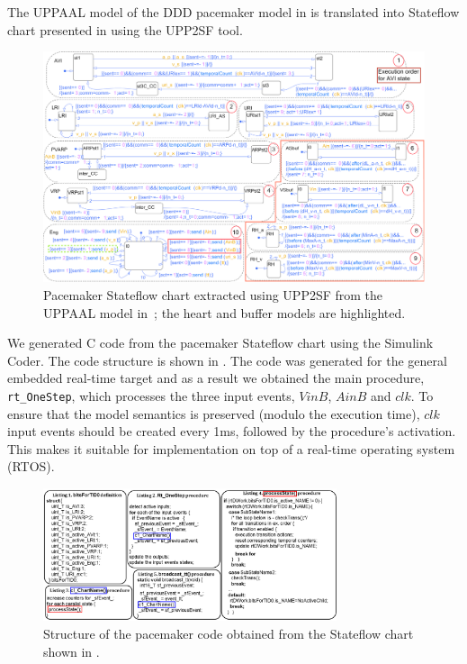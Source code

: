 The UPPAAL model of the DDD pacemaker model in  is translated into Stateflow chart presented in  using the UPP2SF tool.
\begin{figure} [!t]
\center
\includegraphics[width=1.00\textwidth]{figs/PM_SF_buffer_newC1.png} 
\caption{Pacemaker Stateflow chart extracted using UPP2SF from the UPPAAL model in~; the heart and buffer models are highlighted.} 
\label{fig:PM_sf}
\end{figure}

We generated C code from the pacemaker Stateflow chart using the Simulink Coder. The code structure is shown in .
The code was generated for the general embedded real-time target and as a result we obtained the main procedure, \texttt{rt\_OneStep}, which processes the three input events, $VinB$, $AinB$ and $clk$. To ensure that the model semantics is preserved (modulo the execution time), $clk$ input events should be created every 1ms, followed by the procedure's activation. This makes it suitable for implementation on top of a real-time operating system (RTOS).

\begin{figure} [!t]
\center
\includegraphics[width=0.77\textwidth]{figs/CodeListingFinal.png}
\caption{Structure of the pacemaker code obtained from the Stateflow chart shown in .}
\label{fig:pm_code}
\end{figure}


